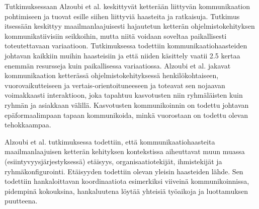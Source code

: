 Tutkimuksessaan Alzoubi et al. \cite{ALZOUBI201622} keskittyvät ketterään liittyvän kommunikaation pohtimiseen ja tuovat esille siihen liittyviä haasteita ja ratkaisuja. Tutkimus itsessään keskittyy maailmanlaajuisesti hajautetun ketterän ohjelmistokehityksen kommunikatiivisiin seikkoihin, mutta niitä voidaan soveltaa paikallisesti toteutettavaan variaatioon. Tutkimuksessa todettiin kommunikaatiohaasteiden johtavan kaikkiin muihin haasteisiin ja että niiden käsittely vaatii 2.5 kertaa enemmän resursseja kuin paikallisessa variaatiossa. Alzoubi et al. jakavat kommunikaation ketterässä ohjelmistokehityksessä henkilökohtaiseen, vuorovaikutteiseen ja vertais-orientoituneeseen ja toteavat sen nojaavan voimakkaasti interaktioon, joka tapahtuu kasvotusten niin ryhmäläisten kuin ryhmän ja asiakkaan välillä. Kasvotusten kommunikoinnin on todettu johtavan epäformaalimpaan tapaan kommunikoida, minkä vuorostaan on todettu olevan tehokkaampaa.

Alzoubi et al. tutkimuksessa \cite{ALZOUBI201622} todettiin, että kommunikaatiohaasteita maailmanlaajuisen ketterän kehityksen kontekstissa aiheuttavat muun muassa (esiintyvyysjärjestyksessä) etäisyys, organisaatiotekijät, ihmistekijät ja ryhmäkonfigurointi. Etäisyyden todettiin olevan yleisin haasteiden lähde. Sen todettiin hankaloittavan koordinaatiota esimerkiksi viiveinä kommunikoinnissa, pidempinä kokouksina, hankaluutena löytää yhteisiä työaikoja ja luottamuksen puutteena. 